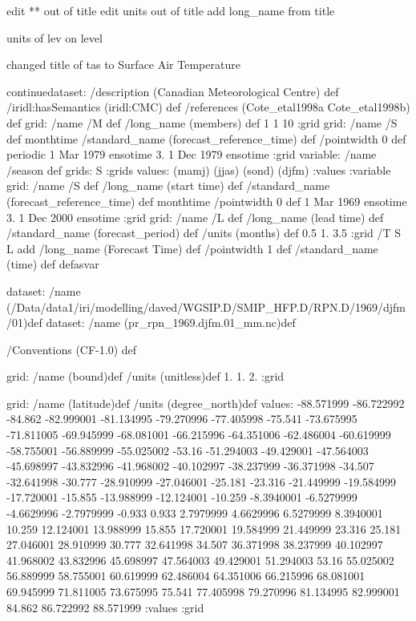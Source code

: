edit ** out of title
edit units out of title
add long_name from title

units of lev on level

changed title of tas to Surface Air Temperature
\begin{ingrid}
continuedataset:
/description (Canadian Meteorological Centre) def
/iridl:hasSemantics (iridl:CMC) def
/references (Cote_etal1998a Cote_etal1998b) def
grid:
/name /M def
/long_name (members) def
1 1 10
:grid
grid:
/name /S def
monthtime
/standard_name (forecast_reference_time) def
/pointwidth 0 def
periodic
1 Mar 1979 ensotime
3.
1 Dec 1979 ensotime
:grid
variable:
/name /season def
grids: S :grids
values:
(mamj)
(jjas)
(sond)
(djfm)
:values
:variable
grid:
/name /S def
/long_name (start time) def
/standard_name (forecast_reference_time) def
monthtime
/pointwidth 0 def
1 Mar 1969 ensotime
3.
1 Dec 2000 ensotime
:grid
grid:
/name /L def
/long_name (lead time) def
/standard_name (forecast_period) def
/units (months) def
0.5 1. 3.5
:grid
/T { S L add /long_name (Forecast Time) def /pointwidth 1 def
/standard_name (time) def
} defasvar
\end{ingrid}
dataset:
/name (/Data/data1/iri/modelling/daved/WGSIP.D/SMIP_HFP.D/RPN.D/1969/djfm/01)def
dataset:
/name (pr_rpn_1969.djfm.01_mm.nc)def
\begin{ingrid}
 /Conventions (CF-1.0) def
\end{ingrid}
grid:
/name (bound)def
/units (unitless)def
 1. 1. 2.
:grid
\begin{ingrid}
grid:
/name (latitude)def
/units (degree_north)def
values: -88.571999 -86.722992 -84.862 -82.999001 -81.134995 -79.270996 -77.405998 -75.541 -73.675995 -71.811005 -69.945999 -68.081001 -66.215996 -64.351006 -62.486004 -60.619999 -58.755001 -56.889999 -55.025002 
-53.16 -51.294003 -49.429001 -47.564003 -45.698997 -43.832996 -41.968002 -40.102997 -38.237999 -36.371998 -34.507 -32.641998 -30.777 -28.910999 -27.046001 -25.181 -23.316 -21.449999 -19.584999 -17.720001
 -15.855 -13.988999 -12.124001 -10.259 -8.3940001 -6.5279999 -4.6629996 -2.7979999 -0.933 0.933 2.7979999 4.6629996 6.5279999
 8.3940001 10.259 12.124001 13.988999 15.855 17.720001 19.584999 21.449999 23.316 25.181 27.046001 28.910999 30.777 32.641998 34.507 36.371998 38.237999 40.102997 41.968002 43.832996 45.698997 47.564003 49.429001
 51.294003 53.16 55.025002 56.889999 58.755001 60.619999 62.486004 64.351006 66.215996 68.081001 69.945999 71.811005 73.675995 75.541 77.405998 79.270996 81.134995 82.999001 84.862 86.722992 88.571999 :values
:grid
\end{ingrid}
